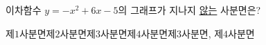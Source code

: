 이차함수 $y=-x^2+6x-5$의 그래프가 지나지 \underline{않는} 사분면은?
\begin{choices32}{제$1$사분면}{제$2$사분면}{제$3$사분면}{제$4$사분면}{제$3$사분면, 제$4$사분면}\end{choices32}
